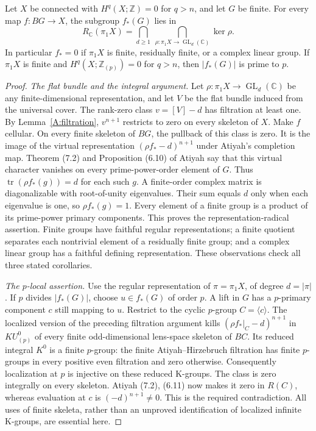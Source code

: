 \begin{theorem}\label{A:representation}
Let $X$ be connected with $H^q(X;\mathbb Z)=0$ for $q>n$, and let $G$ be finite.
For every map $f:BG\to X$, the subgroup $f_*(G)$ lies in
\[
 R_{\mathbb C}(\pi_1X)=
 \bigcap_{d\geq1}\ \bigcap_{\rho:\pi_1X\to\operatorname{GL}_d(\mathbb C)}
 \ker\rho.
\]
In particular $f_*=0$ if $\pi_1X$ is finite, residually finite, or a complex
linear group. If $\pi_1X$ is finite and $H^q(X;\mathbb Z_{(p)})=0$ for $q>n$,
then $|f_*(G)|$ is prime to $p$.
\end{theorem}
\begin{proof}
\emph{The flat bundle and the integral argument.}
Let $\rho:\pi_1X\to\operatorname{GL}_d(\mathbb C)$ be any finite-dimensional
representation, and let $V$ be the flat bundle induced from the universal
cover. The rank-zero class $v=[V]-d$ has filtration at least one. By
Lemma~\ref{A:filtration}, $v^{n+1}$ restricts to zero on every skeleton of $X$.
Make $f$ cellular. On every finite skeleton of $BG$, the pullback of this class
is zero. It is the image of the virtual representation
$(\rho f_*-d)^{n+1}$ under Atiyah's completion map. Theorem (7.2) and
Proposition (6.10) of Atiyah say that this virtual character vanishes on every
prime-power-order element of $G$. Thus
$\operatorname{tr}(\rho f_*(g))=d$ for each such $g$. A finite-order complex
matrix is diagonalizable with root-of-unity eigenvalues. Their sum equals
$d$ only when each eigenvalue is one, so $\rho f_*(g)=1$. Every element of a
finite group is a product of its prime-power primary components. This proves
the representation-radical assertion. Finite groups have faithful regular
representations; a finite quotient separates each nontrivial element of a
residually finite group; and a complex linear group has a faithful defining
representation. These observations check all three stated corollaries.

\emph{The $p$-local assertion.}
Use the regular representation of $\pi=\pi_1X$, of degree $d=|\pi|$.
If $p$ divides $|f_*(G)|$, choose $u\in f_*(G)$ of order $p$. A lift in $G$
has a $p$-primary component $c$ still mapping to $u$. Restrict to the cyclic
$p$-group $C=\langle c\rangle$. The localized version of the preceding
filtration argument kills $(\rho f_*|_C-d)^{n+1}$ in $KU_{(p)}^0$ of every
finite odd-dimensional lens-space skeleton of $BC$. Its reduced integral
$K^0$ is a finite $p$-group: the finite Atiyah--Hirzebruch filtration has
finite $p$-groups in every positive even filtration and zero otherwise.
Consequently localization at $p$ is injective on these reduced K-groups.
The class is zero integrally on every skeleton. Atiyah (7.2), (6.11) now makes
it zero in $R(C)$, whereas evaluation at $c$ is $(-d)^{n+1}\ne0$. This is the
required contradiction. All uses of finite skeleta, rather than an unproved
identification of localized infinite K-groups, are essential here.
\end{proof}

